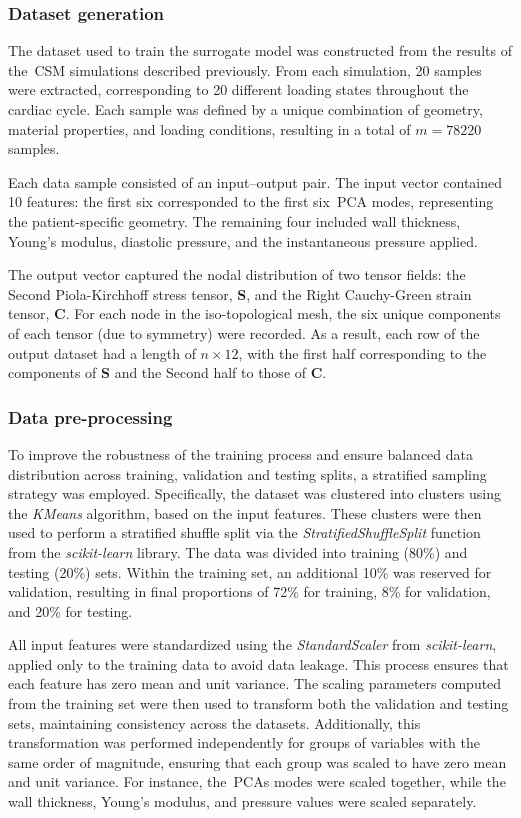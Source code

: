 \documentclass[a4paper,fleqn]{cas-sc}
\begin{document}
  \subsubsection{Dataset generation}
    The dataset used to train the surrogate model was constructed from the results of the~\gls{CSM} simulations described previously. From each simulation, 20 samples were extracted, corresponding to 20 different loading states throughout the cardiac cycle. Each sample was defined by a unique combination of geometry, material properties, and loading conditions, resulting in a total of $m = 78220$ samples.

    Each data sample consisted of an input–output pair. The input vector contained 10 features: the first six corresponded to the first six~\gls{PCA} modes, representing the patient-specific geometry. The remaining four included wall thickness, Young's modulus, diastolic pressure, and the instantaneous pressure applied.

    The output vector captured the nodal distribution of two tensor fields: the Second Piola-Kirchhoff stress tensor, $\bm{S}$, and the Right Cauchy-Green strain tensor, $\bm{C}$. For each node in the iso-topological mesh, the six unique components of each tensor (due to symmetry) were recorded. As a result, each row of the output dataset had a length of $n \times 12$, with the first half corresponding to the components of $\bm{S}$ and the Second half to those of $\bm{C}$.

  \subsubsection{Data pre-processing}
    To improve the robustness of the training process and ensure balanced data distribution across training, validation and testing splits, a stratified sampling strategy was employed. Specifically, the dataset was clustered into clusters using the \textit{KMeans} algorithm, based on the input features. These clusters were then used to perform a stratified shuffle split via the \textit{StratifiedShuffleSplit} function from the \textit{scikit-learn} library. The data was divided into training (80\%) and testing (20\%) sets. Within the training set, an additional 10\% was reserved for validation, resulting in final proportions of 72\% for training, 8\% for validation, and 20\% for testing.

    All input features were standardized using the \textit{StandardScaler} from \textit{scikit-learn}, applied only to the training data to avoid data leakage. This process ensures that each feature has zero mean and unit variance. The scaling parameters computed from the training set were then used to transform both the validation and testing sets, maintaining consistency across the datasets. Additionally, this transformation was performed independently for groups of variables with the same order of magnitude, ensuring that each group was scaled to have zero mean and unit variance. For instance, the~\glspl{PCA} modes were scaled together, while the wall thickness, Young's modulus, and pressure values were scaled separately.
        
\end{document}
